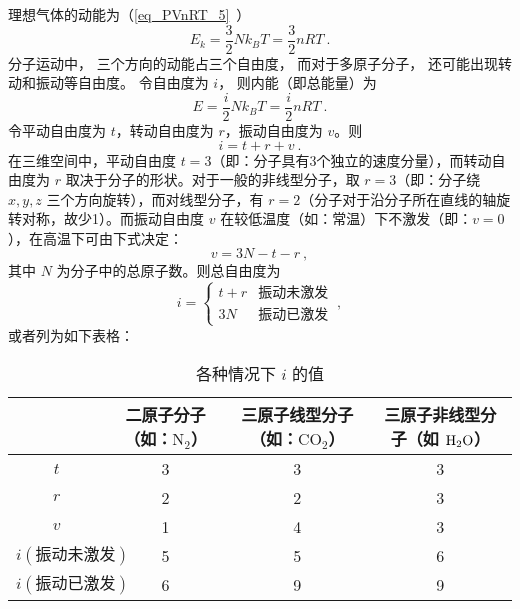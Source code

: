 


理想气体的动能为（\autoref{eq_PVnRT_5}~）
\begin{equation}
E_k = \frac32 Nk_B T = \frac{3}{2}nRT~.
\end{equation}
分子运动中， 三个方向的动能占三个自由度， 而对于多原子分子， 还可能出现转动和振动等自由度。 令自由度为 $i$， 则内能（即总能量）为
\begin{equation}\label{eq_IdgEng_1}
E = \frac{i}{2}Nk_B T = \frac{i}{2}nRT~.
\end{equation}
令平动自由度为 $t$，转动自由度为 $r$，振动自由度为 $v$。则
\begin{equation}
i=t+r+v~.
\end{equation}
在三维空间中，平动自由度 $t=3$（即：分子具有3个独立的速度分量），而转动自由度为 $r$ 取决于分子的形状。对于一般的非线型分子，取 $r=3$（即：分子绕 $x,y,z$ 三个方向旋转），而对线型分子，有 $r=2$（分子对于沿分子所在直线的轴旋转对称，故少1）。而振动自由度 $v$ 在较低温度（如：常温）下不激发（即：$v=0$），在高温下可由下式决定：
\begin{equation}
v=3N-t-r~,
\end{equation}
其中 $N$ 为分子中的总原子数。则总自由度为
\begin{equation}
i=\left\{\begin{matrix}{t+r}&{\text{振动未激发}}\\{3N}&{\text{振动已激发}}\end{matrix}\right.~,
\end{equation}
或者列为如下表格：\begin{table}[ht]
\centering
\caption{各种情况下 $i$ 的值}\label{tab_IdgEng_1}
\begin{tabular}{|c|c|c|c|}
\hline
 & 二原子分子（如：$\text{N}_2$） & 三原子线型分子（如：$\text{CO}_2$） & 三原子非线型分子（如 $\text H_2\text O$） \\
\hline
$t$ & 3 & 3 & 3 \\
\hline
$r$ & 2 & 2 & 3 \\
\hline
$v$ & 1 & 4 & 3 \\
\hline
$i(\text{振动未激发})$ & 5 & 5 & 6 \\
\hline
$i(\text{振动已激发})$ & 6 & 9 & 9 \\
\hline
\end{tabular}
\end{table}
